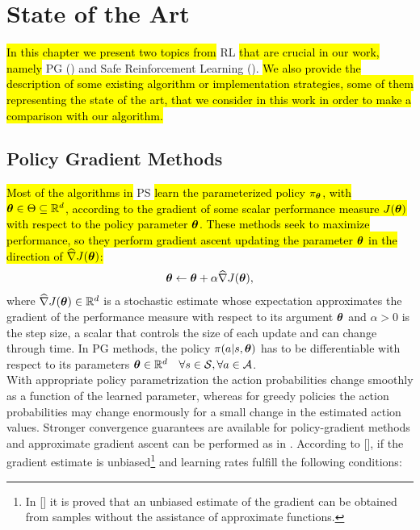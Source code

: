 \chapter{State of the Art} \label{chap:state}
\hl{In this chapter we present two topics from} \ac{RL} \hl{that are crucial in our work, namely} \acf{PG} () and Safe Reinforcement Learning (). \hl{We also provide the description of some existing algorithm or implementation strategies, some of them representing the state of the art, that we consider in this work in order to make a comparison with our algorithm.}

\section{Policy Gradient Methods} \label{sec:pg}
\hl{Most of the algorithms in} \ac{PS} \hl{learn the parameterized policy $\pi_{\boldsymbol{\theta}}$, with $\boldsymbol{\theta} \in \Theta \subseteq \mathbb{R}^d$, according to the gradient of some scalar performance measure $J(\boldsymbol{\theta})$ with respect to the policy parameter $\boldsymbol{\theta}$. These methods seek to maximize performance, so they perform gradient ascent updating the parameter $\boldsymbol{\theta}$ in the direction of $\widehat{\nabla}J(\boldsymbol{\theta})$:}
\begin{align}
\boldsymbol{\theta} \leftarrow \boldsymbol{\theta} + \alpha \widehat{\nabla}J(\boldsymbol{\theta}), \label{eq:grad}
\end{align}
where $\widehat{\nabla}J(\boldsymbol{\theta}) \in \mathbb{R}^d$ is a stochastic estimate whose expectation approximates the gradient of the performance measure with respect to its argument $\boldsymbol{\theta}$ and $\alpha>0$ is the step size, a scalar that controls the size of each update and can change through time. In \ac{PG} methods, the policy $\pi(a|s,\boldsymbol{\theta})$ has to be differentiable with respect to its parameters $\boldsymbol{\theta} \in \mathbb{R}^d \quad \forall s \in \mathcal{S}, \forall a \in \mathcal{A}$.\\
\newline
With appropriate policy parametrization the action probabilities change smoothly as a function of the learned parameter, whereas for greedy policies the action probabilities may change enormously for a small change in the estimated action values. Stronger convergence guarantees are available for policy-gradient methods and approximate gradient ascent can be performed as in . According to [\cite{peters2010pg}], if the gradient estimate is unbiased\footnote{In [\cite{williams1992simple}] it is proved that an unbiased estimate of the gradient can be obtained from samples without the assistance of approximate functions.} and learning rates fulfill the following conditions:
